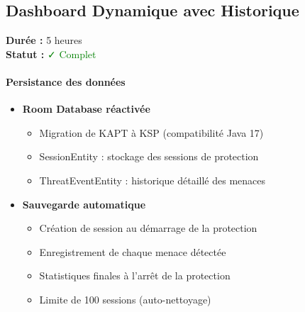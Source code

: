 \documentclass[11pt,a4paper]{article}
\begin{document}
\subsection{Dashboard Dynamique avec Historique}

\textbf{Durée :} 5 heures \\
\textbf{Statut :} \textcolor{green}{✓ Complet}

\paragraph{Persistance des données}
\begin{itemize}
    \item \textbf{Room Database réactivée}
    \begin{itemize}
        \item Migration de KAPT à KSP (compatibilité Java 17)
        \item SessionEntity : stockage des sessions de protection
        \item ThreatEventEntity : historique détaillé des menaces
    \end{itemize}
    \item \textbf{Sauvegarde automatique}
    \begin{itemize}
        \item Création de session au démarrage de la protection
        \item Enregistrement de chaque menace détectée
        \item Statistiques finales à l'arrêt de la protection
        \item Limite de 100 sessions (auto-nettoyage)
    \end{itemize}
\end{itemize}
\end{document}
